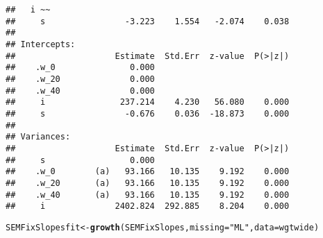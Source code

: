 \documentclass{article}\usepackage[]{graphicx}\usepackage[]{color}
\makeatletter
\newcommand{\hlstr}[1]{\textcolor[rgb]{0.192,0.494,0.8}{#1}}%
\newcommand{\hlstd}[1]{\textcolor[rgb]{0.345,0.345,0.345}{#1}}%
\newcommand{\hlkwb}[1]{\textcolor[rgb]{0.69,0.353,0.396}{#1}}%
\newcommand{\hlkwc}[1]{\textcolor[rgb]{0.333,0.667,0.333}{#1}}%
\newcommand{\hlkwd}[1]{\textcolor[rgb]{0.737,0.353,0.396}{\textbf{#1}}}%
\newenvironment{kframe}{%
 \def\at@end@of@kframe{}%
 \ifinner\ifhmode%
  \def\at@end@of@kframe{\end{minipage}}%
  \begin{minipage}{\columnwidth}%
 \fi\fi%
 \def\FrameCommand##1{\hskip\@totalleftmargin \hskip-\fboxsep
 \colorbox{shadecolor}{##1}\hskip-\fboxsep
     \hskip-\linewidth \hskip-\@totalleftmargin \hskip\columnwidth}%
 \MakeFramed {\advance\hsize-\width
   \@totalleftmargin\z@ \linewidth\hsize
   \@setminipage}}%
 {\par\unskip\endMakeFramed%
 \at@end@of@kframe}
\newenvironment{knitrout}{}{} %
\makeatother
\begin{document}
\begin{knitrout}
\begin{kframe}
\begin{verbatim}
##   i ~~                                                
##     s                -3.223    1.554   -2.074    0.038
## 
## Intercepts:
##                    Estimate  Std.Err  z-value  P(>|z|)
##    .w_0               0.000                           
##    .w_20              0.000                           
##    .w_40              0.000                           
##     i               237.214    4.230   56.080    0.000
##     s                -0.676    0.036  -18.873    0.000
## 
## Variances:
##                    Estimate  Std.Err  z-value  P(>|z|)
##     s                 0.000                           
##    .w_0        (a)   93.166   10.135    9.192    0.000
##    .w_20       (a)   93.166   10.135    9.192    0.000
##    .w_40       (a)   93.166   10.135    9.192    0.000
##     i              2402.824  292.885    8.204    0.000
\end{verbatim}
\begin{alltt}
\hlstd{SEMFixSlopesfit} \hlkwb{<-} \hlkwd{growth}\hlstd{(SEMFixSlopes,} \hlkwc{missing} \hlstd{=} \hlstr{"ML"}\hlstd{,} \hlkwc{data} \hlstd{= wgtwide)}
\end{alltt}



\end{kframe}
\end{knitrout}
\end{document}
